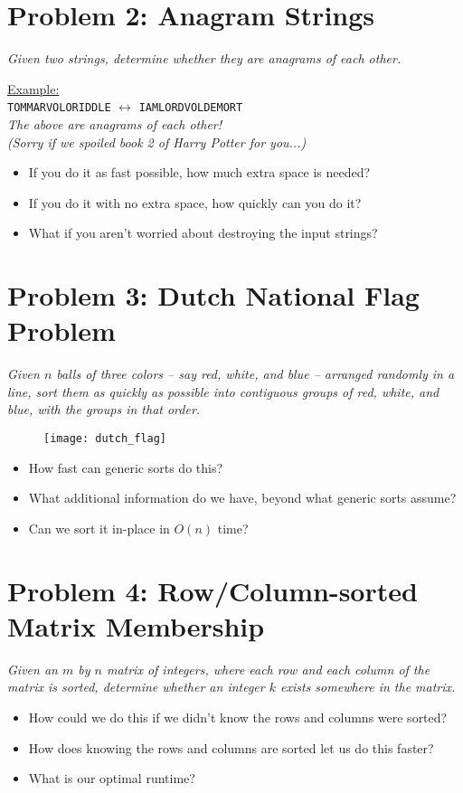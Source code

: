 \section*{Problem 2: Anagram Strings}
\textit{Given two strings, determine whether they are anagrams of each other.}

\begin{center}
    \uline{Example:}\\

    \texttt{TOMMARVOLORIDDLE} $\longleftrightarrow$ \texttt{IAMLORDVOLDEMORT}\\

    \textit{The above are anagrams of each other!\\ (Sorry if we spoiled book 2 of Harry Potter for you...)}
\end{center}

\begin{itemize}
    \item If you do it as fast possible, how much extra space is needed?
    \item If you do it with no extra space, how quickly can you do it?
    \item What if you aren't worried about destroying the input strings?
\end{itemize}

\section*{Problem 3: Dutch National Flag Problem}
\textit{Given $n$ balls of three colors – say red, white, and blue – arranged randomly in a line, sort them as quickly as possible into contiguous groups of red, white, and blue, with the groups in that order.}

\begin{figure}[h]
    \centering
    \texttt{[image: dutch\_flag]}
\end{figure}

\begin{itemize}
    \item How fast can generic sorts do this?
    \item What additional information do we have, beyond what generic sorts assume?
    \item Can we sort it in-place in $O(n)$ time?
\end{itemize}

\section*{Problem 4: Row/Column-sorted Matrix Membership}
\textit{Given an $m$ by $n$ matrix of integers, where each row and each column of the matrix is sorted, determine whether an integer $k$ exists somewhere in the matrix.}
\begin{itemize}
    \item How could we do this if we didn't know the rows and columns were sorted?
    \item How does knowing the rows and columns are sorted let us do this faster?
    \item What is our optimal runtime?
\end{itemize}
    
